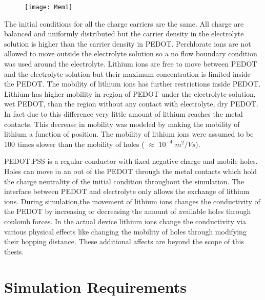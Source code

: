 \begin{figure}[!htp]
\centering
\texttt{[image: Mem1]}
\caption{} 
\label{MemStc}
\end{figure}

The initial conditions for all the charge carriers are the same. All charge are balanced and uniformly distributed but the carrier density in the electrolyte solution is higher than the carrier density in PEDOT. Perchlorate ions are not allowed to move outside the electrolyte solution so a no flow boundary condition was used around the electrolyte. Lithium ions are free to move between PEDOT and the electrolyte solution but their maximum concentration is limited inside the PEDOT. The mobility of lithium ions has further restrictions inside PEDOT. Lithium has higher mobility in region of PEDOT under the electrolyte solution, wet PEDOT, than the region without any contact with electrolyte, dry PEDOT. In fact due to this difference very little amount of lithium reaches the metal contacts. This decrease in mobility was modeled by making the mobility of lithium a function of position. The mobility of lithium ions were assumed to be 100 times slower than the mobility of holes ( $\approx$ $10^{-4}$ $m^2/Vs$).  

PEDOT:PSS is a regular conductor with fixed negative charge and mobile holes. Holes can move in an out of the PEDOT through the metal contacts which hold the charge neutrality of the initial condition throughout the simulation. The interface between PEDOT and electrolyte only allows the exchange of lithium ions. During simulation,the movement of lithium ions changes the conductivity of the PEDOT by increasing or decreasing the amount of available holes through coulomb forces. In the actual device lithium ions change the conductivity via various physical effects like changing the mobility of holes through modifying their hopping distance. These additional affects are beyond the scope of this thesis. 


\clearpage
\section{Simulation Requirements}

